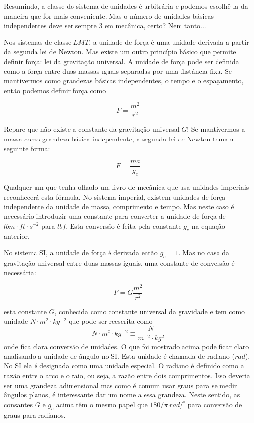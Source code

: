 Resumindo, a classe do sistema de unidades é arbitrária e podemos escolhê-la da maneira que for mais conveniente. Mas o número de unidades básicas independentes deve  ser sempre 3 em mecânica, certo? Nem tanto...

Nos sistemas de classe $LMT$, a unidade de força é uma unidade derivada a partir da segunda lei de Newton. Mas existe um outro princípio básico que permite definir força: lei da gravitação universal. A unidade de força pode ser definida como a força entre duas massas iguais separadas por uma distância fixa. Se mantivermos como grandezas básicas independentes, o tempo e o espaçamento, então podemos definir força como

\[
F = \frac{m^2}{r^2}
\]

Repare que não existe a constante da gravitação universal $G$! Se mantivermos a massa como grandeza básica independente, a segunda lei de Newton toma a seguinte forma:

\[
F = \frac{ma}{g_c}
\]

Qualquer um que tenha olhado um livro de mecânica que usa unidades imperiais reconhecerá esta fórmula. No sistema imperial, existem unidades de força independente da unidade de massa, comprimento e tempo. Mas neste caso é necessário introduzir uma constante para converter a unidade de força de $lbm\cdot ft \cdot s^{-2}$ para $lbf$. Esta conversão é feita pela constante $g_c$ na equação anterior.

No sistema SI, a unidade de força é derivada então $g_c = 1$. Mas no caso da gravitação universal entre duas massas iguais, uma constante de conversão é necessária:

\[
F = G \frac{m^2}{r^2}
\]

esta constante $G$, conhecida como constante universal da gravidade e tem como unidade $N\cdot m^2 \cdot kg^{-2}$ que pode ser reescrita como
\[
N\cdot m^2 \cdot kg^{-2} \equiv \frac{N}{m^{-2}\cdot kg^2}
\]
onde fica clara conversão de unidades. O que foi mostrado acima pode ficar claro analisando a unidade de ângulo no SI. Esta unidade é chamada de radiano ($rad$). No SI ela é designada como uma unidade especial. O radiano é definido como a razão entre o arco e o raio, ou seja, a razão entre dois comprimentos. Isso deveria ser uma grandeza adimensional mas como é comum usar graus para se medir ângulos planos, é interessante dar um nome a essa grandeza. Neste sentido, as consantes $G$ e $g_c$ acima têm o mesmo papel que $180/\pi\: rad/^\circ$ para conversão de graus para radianos.

